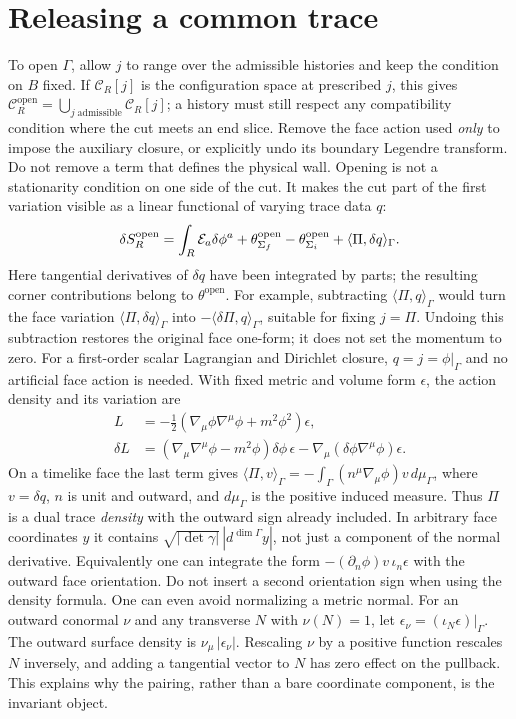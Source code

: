 \section{Releasing a common trace}
To open $\Gamma$, allow $j$ to range over the admissible histories and keep
the condition on $B$ fixed. If $\mathcal C_R[j]$ is the configuration space
at prescribed $j$, this gives $\mathcal C_R^{\mathrm{open}}
=\bigcup_{j\;\mathrm{admissible}}\mathcal C_R[j]$; a history must still
respect any compatibility condition where the cut meets an end slice.
Remove the face action used \emph{only} to impose
the auxiliary closure, or explicitly undo its boundary Legendre transform.
Do not remove a term that defines the physical wall. Opening is not a
stationarity condition on one side of the cut. It makes the cut part of the
first variation visible as a linear functional of varying trace data $q$:
\[
 \delta S_R^{\mathrm{open}}=\int_R {\cal E}_a\delta\phi^a
 +\theta^{\mathrm{open}}_{\Sigma_f}-\theta^{\mathrm{open}}_{\Sigma_i}
 +\langle\Pi,\delta q\rangle_\Gamma.
\]
Here tangential derivatives of $\delta q$ have been integrated by parts;
the resulting corner contributions belong to $\theta^{\mathrm{open}}$.
For example, subtracting $\langle\Pi,q\rangle_\Gamma$ would turn the
face variation $\langle\Pi,\delta q\rangle_\Gamma$ into
$-\langle\delta\Pi,q\rangle_\Gamma$, suitable for fixing $j=\Pi$. Undoing
this subtraction restores the original face one-form; it does not set the
momentum to zero.
For a first-order scalar Lagrangian and Dirichlet closure, $q=j=\phi|_\Gamma$
and no artificial face action is needed. With fixed metric and volume form
$\epsilon$, the action density and its variation are
\begin{align*}
 L&=-\tfrac12(\nabla_\mu\phi\nabla^\mu\phi+m^2\phi^2)\epsilon,\\
 \delta L&=(\nabla_\mu\nabla^\mu\phi-m^2\phi)\delta\phi\,\epsilon
       -\nabla_\mu(\delta\phi\nabla^\mu\phi)\epsilon.
\end{align*}
On a timelike face the last term gives
$\langle\Pi,v\rangle_\Gamma=-\int_\Gamma (n^\mu\nabla_\mu\phi)v\,d\mu_\Gamma$,
where $v=\delta q$, $n$ is unit and outward, and $d\mu_\Gamma$ is the positive
induced measure. Thus $\Pi$ is a dual trace \emph{density} with the outward
sign already included. In arbitrary face coordinates $y$ it contains
$\sqrt{|\det\gamma|}\,|d^{\dim\Gamma}y|$, not just a component of the
normal derivative. Equivalently one can integrate the form
$-(\partial_n\phi)v\,\iota_n\epsilon$ with the outward face orientation.
Do not insert a second orientation sign when using the density formula.
One can even avoid normalizing a metric normal. For an outward conormal
$\nu$ and any transverse $N$ with $\nu(N)=1$, let
$\epsilon_\nu=(\iota_N\epsilon)|_\Gamma$. The outward surface density is
$\nu_\mu\,|\epsilon_\nu|$. Rescaling $\nu$ by a positive
function rescales $N$ inversely, and adding a tangential vector to $N$ has
zero effect on the pullback. This explains why the pairing, rather than a
bare coordinate component, is the invariant object.

